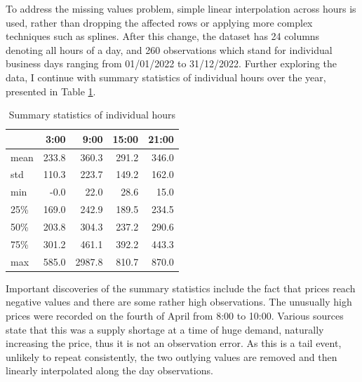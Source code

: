 \documentclass{article}
\begin{document}
To address the missing values problem, simple linear interpolation across hours is used, rather than dropping the affected rows or applying more complex techniques such as splines.
After this change, the dataset has 24 columns denoting all hours of a day, and 260 observations which stand for individual business days ranging from 01/01/2022 to 31/12/2022.
Further exploring the data, I continue with summary statistics of individual hours over the year, presented in Table \ref{tab:Table 1}.
\begin{table}[H]
  \centering
  \caption{Summary statistics of individual hours}
    \begin{tabular}{lrrrr}
      \toprule
       & 3:00 & 9:00 & 15:00 & 21:00 \\
      \midrule
    mean & 233.8 & 360.3 & 291.2 & 346.0 \\
    std & 110.3 & 223.7 & 149.2 & 162.0 \\
    min & -0.0 & 22.0 & 28.6 & 15.0 \\
    25\% & 169.0 & 242.9 & 189.5 & 234.5 \\
    50\% & 203.8 & 304.3 & 237.2 & 290.6 \\
    75\% & 301.2 & 461.1 & 392.2 & 443.3 \\
    max & 585.0 & 2987.8 & 810.7 & 870.0 \\
    \bottomrule
    \end{tabular}
  \label{tab:Table 1}
\end{table}
Important discoveries of the summary statistics include the fact that prices reach negative values and there are some rather high observations.
The unusually high prices were recorded on the fourth of April from 8:00 to 10:00.
Various sources state that this was a supply shortage at a time of huge demand, naturally increasing the price, thus it is not an observation error.
As this is a tail event, unlikely to repeat consistently, the two outlying values are removed and then linearly interpolated along the day observations.
\end{document}
